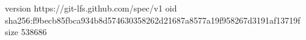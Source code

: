 version https://git-lfs.github.com/spec/v1
oid sha256:f9becb85fbca934b8d574630358262d21687a8577a19f958267d3191af13719f
size 538686

